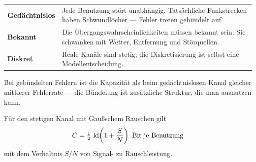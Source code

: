 \begin{warnung}
\begin{center}
{\small
\renewcommand{\arraystretch}{1.52}
\begin{tabular}{@{}P{2.4cm}P{6.2cm}@{}}
\toprule
\textbf{Gedächtnislos} & Jede Benutzung stört unabhängig. Tatsächliche Funkstrecken haben Schwundlöcher --- Fehler treten gebündelt auf.\\
\textbf{Bekannt} & Die Übergangswahrscheinlichkeiten müssen bekannt sein. Sie schwanken mit Wetter, Entfernung und Störquellen.\\
\textbf{Diskret} & Reale Kanäle sind stetig; die Diskretisierung ist selbst eine Modellentscheidung.\\
\bottomrule
\end{tabular}}
\end{center}

Bei gebündelten Fehlern ist die Kapazität  als beim gedächtnislosen Kanal gleicher mittlerer Fehlerrate --- die Bündelung ist zusätzliche Struktur, die man ausnutzen kann.

\begin{center}
\begin{minipage}{0.88\textwidth}
\end{minipage}
\end{center}

Für den stetigen Kanal mit Gaußschem Rauschen gilt
\[ C = \tfrac12\,\lb\!\left(1+\frac{S}{N}\right) \ \text{Bit je Benutzung} \]
mit dem Verhältnis $S/N$ von Signal- zu Rauschleistung.

\begin{center}
\begin{minipage}{0.88\textwidth}
\end{minipage}
\end{center}
\end{warnung}

